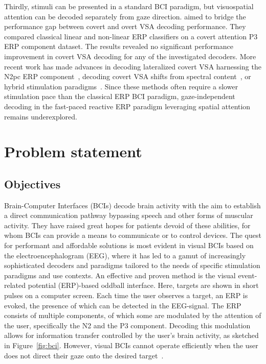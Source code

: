 Thirdly, stimuli can be presented in a standard BCI paradigm, but visuospatial
attention can be decoded separately from gaze direction.
\cite{Aloise2012b} aimed to bridge the performance gap between covert and
overt VSA decoding performance.
They compared classical linear and non-linear ERP classifiers on a covert
attention P3 ERP component dataset.
The results revealed no significant performance improvement in covert VSA
decoding for any of the investigated decoders.
More recent work has made advances in decoding lateralized covert
VSA harnessing the N2pc ERP component~\cite{Thiery2016,Reichert2020b,Wang2022},
decoding covert VSA shifts from spectral content~\cite{Tonin2013}, or hybrid
stimulation paradigms~\cite{Egan2017}.
Since these methods often require a slower stimulation pace than the classical
ERP BCI paradigm, gaze-independent decoding in the fast-paced reactive ERP paradigm
leveraging spatial attention remains underexplored.


\section{Problem statement}

\subsection{Objectives}

Brain-Computer Interfaces (BCIs) decode brain activity with the aim to establish a direct communication
pathway bypassing speech and other forms of muscular activity. They have raised great hopes for patients
devoid of these abilities, for whom BCIs can provide a means to communicate or to
control devices.
The quest for performant and affordable solutions is most evident in
visual BCIs based on the electroencephalogram (EEG), where it has led to a gamut of increasingly sophisticated decoders
and paradigms tailored to the needs of specific stimulation paradigms and
use contexts.
An effective and proven method is the visual event-related potential (ERP)-based
oddball interface.
Here, targets are shown in short pulses on a computer screen.
Each time the user observes a target, an ERP is evoked, the presence of which can be
detected in the EEG-signal.
The ERP consists of multiple components, of which some are modulated by the
attention of the user, specifically the N2 and the P3 component.
Decoding this modulation allows for information transfer controlled by the
user's brain activity, as sketched in Figure~\ref{fig:bci}.
However, visual BCIs cannot operate efficiently when the user does not direct
their gaze onto the desired target~\cite{Brunner2010, Frenzel2011}.

